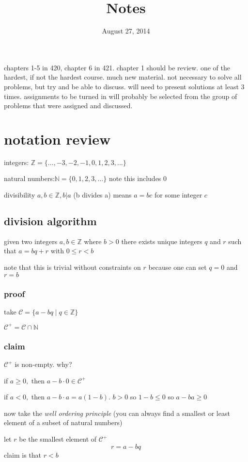 \documentclass[letterpaper]{article}
\begin{document}
\title{Notes}
\date{August 27, 2014}
\maketitle
chapters 1-5 in 420, chapter 6 in 421.
chapter 1 should be review.
one of the hardest, if not the hardest course. much new material.
not necessary to solve all problems, but try and be able to discuss.
will need to present solutions at least 3 times.
assignments to be turned in will probably be selected from the group of problems that were assigned and discussed.

\section*{notation review}
integers: $\mathbb{Z}=\{...,-3,-2,-1,0,1,2,3,...\}$

natural numbers:$\mathbb{N}=\{0,1,2,3,...\}$ note this includes 0

divisibility $a,b\in\mathbb{Z}, b \vert a$ (b divides a) means $a=bc$ for some integer $c$

\subsection*{division algorithm}
given two integers $a,b\in\mathbb{Z}$ where $b>0$ there exists unique integers $q$ and $r$ such that $a=bq+r$ with $0\le r<b$

note that this is trivial without constraints on $r$ because one can set $q=0$ and $r=b$
\subsubsection*{proof}
take $\mathcal{C}=\{a-bq\mid q\in\mathbb{Z}\}$

$\mathcal{C}^+=\mathcal{C}\cap\mathbb{N}$
\subsubsection*{claim}
$\mathcal{C}^+$ is non-empty. why?

if $a\ge 0,$ then $a-b\cdot0\in\mathcal{C}^+$

if $a<0,$ then $a-b\cdot a=a(1-b)$. $b>0$ so $1-b\le0$ so $a-ba\ge0$

now take the \emph{well ordering principle} (you can always find a smallest or least element of a subset of natural numbers)

let $r$ be the smallest element of $\mathcal{C}^+$
\[r=a-bq\]
claim is that $r<b$
\end{document}
